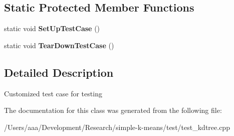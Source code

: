 \subsection*{Static Protected Member Functions}
\begin{DoxyCompactItemize}
\item 
\hypertarget{classKDTreeTest_ad769deefe40a92b3865c2ee88a47bd10}{static void {\bfseries Set\+Up\+Test\+Case} ()}\label{classKDTreeTest_ad769deefe40a92b3865c2ee88a47bd10}

\item 
\hypertarget{classKDTreeTest_a3ba954652e64b01aabfc4e2448758d55}{static void {\bfseries Tear\+Down\+Test\+Case} ()}\label{classKDTreeTest_a3ba954652e64b01aabfc4e2448758d55}

\end{DoxyCompactItemize}


\subsection{Detailed Description}
Customized test case for testing 

The documentation for this class was generated from the following file\+:\begin{DoxyCompactItemize}
\item 
/\+Users/aaa/\+Development/\+Research/simple-\/k-\/means/test/test\+\_\+kdtree.\+cpp\end{DoxyCompactItemize}

